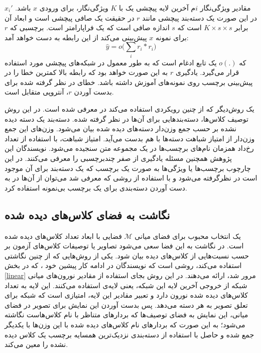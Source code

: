 $x_i'$
 مقادیر ویژگی‌نگار 
  $i$م
  آخرین لایه پیچشی یک    با $K$ ویژگی‌نگار، برای ورودی $x$ باشد. در این صورت یک دسته‌بند پیچشی مانند   $r$ در حقیقت یک صافی پیچشی
است و ابعاد آن برابر 
  $ K \times s \times s$
  است که $s$ اندازه صافی است که یک فراپارامتر است. برچسبی که $r$ برای نمونه $x$ پیش‌بینی می‌کند از این رابطه به دست خواهد آمد:
\begin{equation}
\hat{y} = o \big ( \sum_i r_i \ast r_i \big )
\end{equation}
که $o(.)$ یک تابع ادغام  است که به طور معمول در شبکه‌های پیچشی مورد استفاده قرار می‌گیرد. یادگیری $r$ به این صورت خواهد بود که رابطه بالا کمترین خطا را در پیش‌بینی برچسب روی نمونه‌های آموزش داشته باشد. خطای در نظر گرفته شده برای بدست آوردن $r$، آنتروپی متقابل 
است. 

یک روش‌دیگر که از چنین رویکردی استفاده می‌کند در \cite{ costa} معرفی شده است. در این روش توصیف کلاس‌ها، دسته‌بندهایی برای آن‌ها در نظر گرفته شده. دسته‌بند یک دسته دیده نشده بر حسب جمع وزن‌دار دسته‌های دیده شده بیان می‌شود. وزن‌های این جمع وزن‌دار از امتیاز شباهت دسته‌ها با هم بدست می‌آید. امتیاز شباهت، با استفاده از تعداد رخ‌داد همزمان نام‌های برچسب‌ها در یک مجموعه متن سنجیده می‌شود. نویسندگان این پژوهش همچنین مسئله یادگیری از صفر چندبرچسبی را معرفی می‌کنند. در این چارچوب برچسب‌ها یا ویژگی‌‌ها به صورت یک برچسب که یک دسته‌بند برای آن موجود است در نظرگرفته می‌شود و با استفاده از روشی که معرفی شد می‌توان از آن‌ها در به دست آوردن دسته‌بندی برای یک برچسب بی‌نمونه استفاده کرد. 


\subsection{نگاشت به فضای کلاس‌های دیده شده}\label{toseen}
یک انتخاب محبوب برای فضای میانی $\mathcal{M}$ فضایی با ابعاد تعداد کلاس‌های دیده شده است. در نگاشت به این فضا سعی می‌شود تصاویر یا توصیفات کلاس‌های آزمون  بر حسب نسبت‌هایی از کلاس‌های دیده بیان شود. یکی از روش‌هایی که از چنین نگاشتی استفاده می‌کند، روشی است که نویسندگان \cite{ convex} در ادامه کار پیشین خود  \cite{ devise}، که در بخش \ref{linear} مرور شد، ارائه می‌دهند. در این روش بجای استفاده از مقادیر نورون‌های میانی شبکه  از خروجی آخرین لایه این شبکه، یعنی لایه‌ی  استفاده می‌کنند. این لایه به تعداد کلاس‌های دیده شده نورون دارد و تعبیر مقادیر این لایه، امتیازی است که شبکه برای تعلق تصویر به هر دسته ‌می‌دهد. پس بدست آوردن این نمایش برای تصویر در فضای میانی، این نمایش به فضای توصیف‌ها که بردارهای متناظر با نام کلاس‌هاست نگاشته می‌شود؛ به این صورت که بردارهای نام کلاس‌های دیده شده با این وزن‌ها با یکدیگر جمع شده و حاصل با استفاده از دسته‌بندی نزدیک‌ترین همسایه برچسب یک کلاس دیده نشده را معین می‌کند. 

